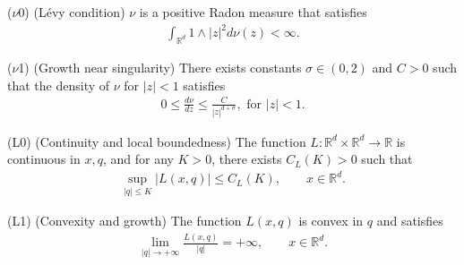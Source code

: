 \documentclass[a4paper,  twoside, 10pt, leqno]{amsart}
\newcommand{\R}{\mathbb{R}}
\theoremstyle{remark}
\theoremstyle{definition}
\newenvironment{description*}%
  {\begin{description}
    \setlength{\itemsep}{0.33em}
  }
  {\end{description}}
\begin{document}
\begin{description*}
\item[($\nu$0)\label{A0}] (L\'evy condition) $\nu$ is a positive Radon measure that satisfies
\begin{align*}
   \int_{\R^d} 1 \wedge |z|^2 d\nu(z) < \infty.
\end{align*}
\item[($\nu$1)\label{A2}] (Growth near singularity) There exists constants $\sigma \in (0,2)$ and $C >0$ such that the density of $\nu$ for $|z|<1$ satisfies
        \begin{align*}
            0 \leq \frac{d\nu}{dz} \leq  \frac{C}{|z|^{d+\sigma}}, \text{ for } |z| < 1.            
        \end{align*}
        
         \item[(L0)\label{L0}](Continuity and local boundedness) The
           function $L: \R^d \times \R^d \to \R$ is continuous in $x,
           q$,  and for any $K>0$, there exists $C_{L}(K)>0$ such that
        \begin{align*}
            \sup_{|q|\leq K}|L(x,q)|\leq C_L(K), \qquad x \in \R^d.
        \end{align*}
        
         \item[(L1)\label{L1}](Convexity and growth) The function $L(x,q)$ is convex in $q$ and satisfies
        \begin{align*}
            \lim_{|q| \to +\infty} \frac{L(x,q)}{|q|} = +\infty, \qquad x \in \R^d.
        \end{align*}
         

\end{description*}
\end{document}
